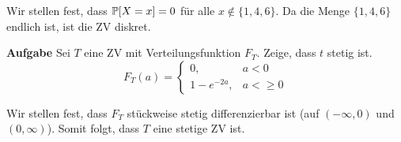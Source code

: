 Wir stellen fest, dass $\mathbb{P}[X = x] = 0$ für alle $x \notin \{1,4,6\}$. Da die Menge $\{1,4,6\}$ endlich ist, ist die ZV diskret.

\hrulefill

\textbf{Aufgabe}
Sei $T$ eine ZV mit Verteilungsfunktion $F_T$. Zeige, dass $t$ stetig ist.
$$ F_T(a) = \begin{cases}
	0, 				& a < 0 \\
	1 - e^{-2a}, 	& a < \geq 0
\end{cases}$$ \medskip

Wir stellen fest, dass $F_T$ stückweise stetig differenzierbar ist (auf $(-\infty, 0)$ und $(0, \infty)$). Somit folgt, dass $T$ eine stetige ZV ist.

